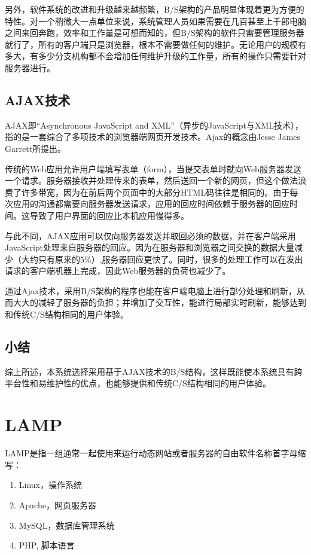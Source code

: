 另外，软件系统的改进和升级越来越频繁，B/S架构的产品明显体现着更为方便的特性。对一个稍微大一点单位来说，系统管理人员如果需要在几百甚至上千部电脑之间来回奔跑，效率和工作量是可想而知的，但B/S架构的软件只需要管理服务器就行了，所有的客户端只是浏览器，根本不需要做任何的维护。无论用户的规模有多大，有多少分支机构都不会增加任何维护升级的工作量，所有的操作只需要针对服务器进行。

\subsection{AJAX技术}
AJAX即“Asynchronous JavaScript and XML”（异步的JavaScript与XML技术），指的是一套综合了多项技术的浏览器端网页开发技术。Ajax的概念由Jesse James Garrett所提出。

传统的Web应用允许用户端填写表单（form），当提交表单时就向Web服务器发送一个请求。服务器接收并处理传来的表单，然后送回一个新的网页，但这个做法浪费了许多带宽，因为在前后两个页面中的大部分HTML码往往是相同的。由于每次应用的沟通都需要向服务器发送请求，应用的回应时间依赖于服务器的回应时间。这导致了用户界面的回应比本机应用慢得多。

与此不同，AJAX应用可以仅向服务器发送并取回必须的数据，并在客户端采用JavaScript处理来自服务器的回应。因为在服务器和浏览器之间交换的数据大量减少（大约只有原来的5\%）,服务器回应更快了。同时，很多的处理工作可以在发出请求的客户端机器上完成，因此Web服务器的负荷也减少了。

通过Ajax技术，采用B/S架构的程序也能在客户端电脑上进行部分处理和刷新，从而大大的减轻了服务器的负担；并增加了交互性，能进行局部实时刷新，能够达到和传统C/S结构相同的用户体验。

\subsection{小结}

综上所述，本系统选择采用基于AJAX技术的B/S结构，这样既能使本系统具有跨平台性和易维护性的优点，也能够提供和传统C/S结构相同的用户体验。

\section{LAMP}
\label{lamp}
LAMP是指一组通常一起使用来运行动态网站或者服务器的自由软件名称首字母缩写：

\begin{enumerate}
\item Linux，操作系统
\item Apache，网页服务器
\item MySQL，数据库管理系统
\item PHP, 脚本语言
\end{enumerate}

